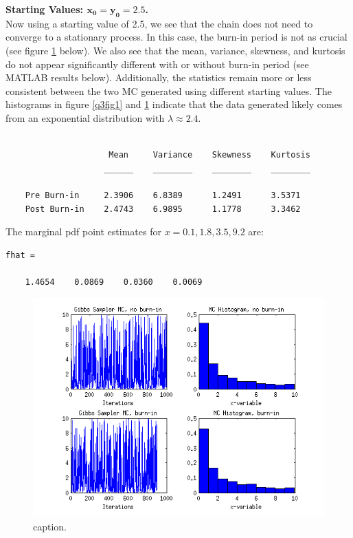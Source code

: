 \documentclass[12pt,a4paper]{article}
\begin{document}
\textbf{Starting Values: $\mathbf{x_0=y_0=2.5}$.}\\
Now using a starting value of 2.5, we see that the chain does not need to converge to a stationary process. In this case, the burn-in period is not as crucial (see figure \ref{q3fig2} below). We also see that the mean, variance, skewness, and kurtosis do not appear significantly different with or without burn-in period (see MATLAB results below). Additionally, the statistics remain more or less consistent between the two MC generated using different starting values. The histograms in figure \ref{q3fig1} and \ref{q3fig2} indicate that the data generated likely comes from an exponential distribution with $\lambda\approx 2.4$.
\begin{verbatim}

                     Mean     Variance    Skewness    Kurtosis
                    ______    ________    ________    ________

    Pre Burn-in     2.3906    6.8389      1.2491      3.5371  
    Post Burn-in    2.4743    6.9895      1.1778      3.3462  
\end{verbatim}
The marginal pdf point estimates for $x=0.1, 1.8, 3.5, 9.2$ are:
\begin{verbatim}
fhat =

    1.4654    0.0869    0.0360    0.0069
\end{verbatim}

\begin{figure}[ht!] 
\begin{center}
\includegraphics[scale=1]{q3graph2.png}
\caption{caption.}
\label{q3fig2}
\end{center}
\end{figure}
\FloatBarrier
\clearpage
\end{document}
